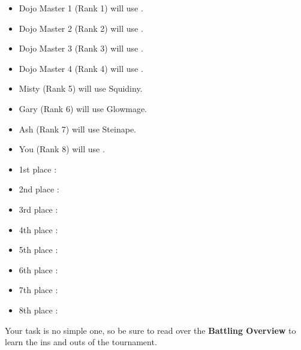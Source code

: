 \begin{multicols}{2}\small
\begin{itemize}
  \item Dojo Master 1 (Rank 1) will use \underline{\hspace{6em}}.
  \item Dojo Master 2 (Rank 2) will use \underline{\hspace{6em}}.
  \item Dojo Master 3 (Rank 3) will use \underline{\hspace{6em}}.
  \item Dojo Master 4 (Rank 4) will use \underline{\hspace{6em}}.
  \item Misty (Rank 5) will use Squidiny.
  \item Gary (Rank 6) will use Glowmage.
  \item Ash (Rank 7) will use Steinape.
  \item You (Rank 8) will use \underline{\hspace{6em}}.
\end{itemize}
\begin{itemize}
  \item 1st place \mappMobimon{}: \underline{\hspace{10em}}
  \item 2nd place \mappMobimon{}: \underline{\hspace{10em}}
  \item 3rd place \mappMobimon{}: \underline{\hspace{10em}}
  \item 4th place \mappMobimon{}: \underline{\hspace{10em}}
  \item 5th place \mappMobimon{}: \underline{\hspace{10em}}
  \item 6th place \mappMobimon{}: \underline{\hspace{10em}}
  \item 7th place \mappMobimon{}: \underline{\hspace{10em}}
  \item 8th place \mappMobimon{}: \underline{\hspace{10em}}
\end{itemize}
\end{multicols}

Your task is no simple one, so be sure to read over the
\textbf{\mappMobimon{} Battling Overview} to learn the ins and outs
of the tournament.

